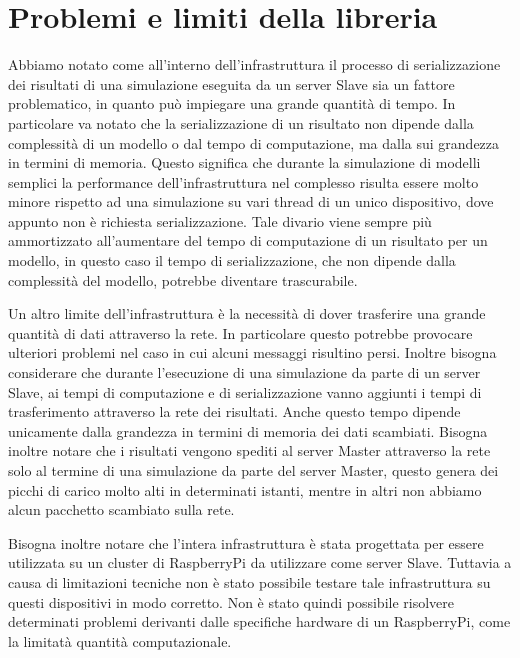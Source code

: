 \section{Problemi e limiti della libreria}

Abbiamo notato come all'interno dell'infrastruttura il processo di serializzazione dei risultati di una simulazione eseguita da un server Slave sia un fattore problematico, in quanto può impiegare una grande quantità di tempo. 
In particolare va notato che la serializzazione di un risultato non dipende dalla complessità di un modello o dal tempo di computazione, ma dalla sui grandezza in termini di memoria. 
Questo significa che durante la simulazione di modelli semplici la performance dell'infrastruttura nel complesso risulta essere molto minore rispetto ad una simulazione su vari thread di un unico dispositivo, dove appunto non è richiesta serializzazione. 
Tale divario viene sempre più ammortizzato all'aumentare del tempo di computazione di un risultato per un modello, in questo caso il tempo di serializzazione, che non dipende dalla complessità del modello, potrebbe diventare trascurabile.

Un altro limite dell'infrastruttura è la necessità di dover trasferire una grande quantità di dati attraverso la rete. 
In particolare questo potrebbe provocare ulteriori problemi nel caso in cui alcuni messaggi risultino persi. Inoltre bisogna considerare che durante l'esecuzione di una simulazione da parte di un server Slave, ai tempi di computazione e di serializzazione vanno aggiunti i tempi di trasferimento attraverso la rete dei risultati. 
Anche questo tempo dipende unicamente dalla grandezza in termini di memoria dei dati scambiati.    
Bisogna inoltre notare che i risultati vengono spediti al server Master attraverso la rete solo al termine di una simulazione da parte del server Master, questo genera dei picchi di carico molto alti in determinati istanti, mentre in altri non abbiamo alcun pacchetto scambiato sulla rete.

Bisogna inoltre notare che l'intera infrastruttura è stata progettata per essere utilizzata su un cluster di RaspberryPi da utilizzare come server Slave. 
Tuttavia a causa di limitazioni tecniche non è stato possibile testare tale infrastruttura su questi dispositivi in modo corretto. 
Non è stato quindi possibile risolvere determinati problemi derivanti dalle specifiche hardware di un RaspberryPi, come la limitatà quantità computazionale.